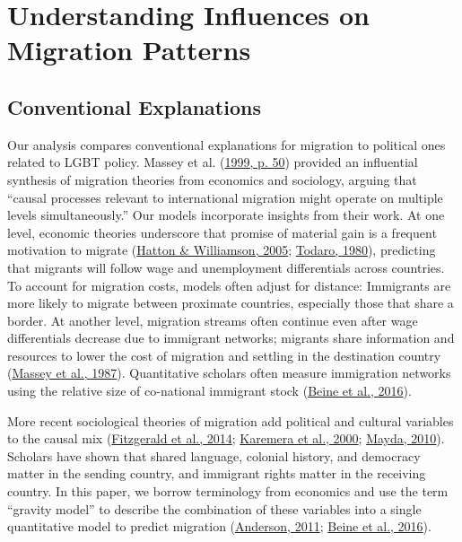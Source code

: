 \documentclass[
  11pt,
]{article}
\begin{document}
\hypertarget{understanding-influences-on-migration-patterns}{%
\section{Understanding Influences on Migration Patterns}\label{understanding-influences-on-migration-patterns}}

\hypertarget{conventional-explanations}{%
\subsection{Conventional Explanations}\label{conventional-explanations}}

Our analysis compares conventional explanations for migration to political ones related to LGBT policy. Massey et al. (\protect\hyperlink{ref-massey_1999}{1999, p. 50}) provided an influential synthesis of migration theories from economics and sociology, arguing that ``causal processes relevant to international migration might operate on multiple levels simultaneously.'' Our models incorporate insights from their work. At one level, economic theories underscore that promise of material gain is a frequent motivation to migrate (\protect\hyperlink{ref-hatton_2005a}{Hatton \& Williamson, 2005}; \protect\hyperlink{ref-todaro_1980}{Todaro, 1980}), predicting that migrants will follow wage and unemployment differentials across countries. To account for migration costs, models often adjust for distance: Immigrants are more likely to migrate between proximate countries, especially those that share a border. At another level, migration streams often continue even after wage differentials decrease due to immigrant networks; migrants share information and resources to lower the cost of migration and settling in the destination country (\protect\hyperlink{ref-massey_1987}{Massey et al., 1987}). Quantitative scholars often measure immigration networks using the relative size of co-national immigrant stock (\protect\hyperlink{ref-beine_2016}{Beine et al., 2016}).

More recent sociological theories of migration add political and cultural variables to the causal mix (\protect\hyperlink{ref-fitzgerald_2014}{Fitzgerald et al., 2014}; \protect\hyperlink{ref-karemera_2000}{Karemera et al., 2000}; \protect\hyperlink{ref-mayda_2010}{Mayda, 2010}). Scholars have shown that shared language, colonial history, and democracy matter in the sending country, and immigrant rights matter in the receiving country. In this paper, we borrow terminology from economics and use the term ``gravity model'' to describe the combination of these variables into a single quantitative model to predict migration (\protect\hyperlink{ref-anderson_2011}{Anderson, 2011}; \protect\hyperlink{ref-beine_2016}{Beine et al., 2016}).
\end{document}
